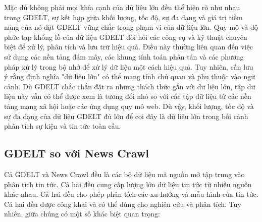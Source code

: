 Mặc dù không phải mọi khía cạnh của dữ liệu lớn đều thể hiện rõ như nhau trong GDELT, sự kết hợp giữa khối lượng, tốc độ, sự đa dạng và giá trị tiềm năng của nó đặt GDELT vững chắc trong phạm vi của dữ liệu lớn. Quy mô và độ phức tạp khổng lồ của dữ liệu GDELT đòi hỏi các công cụ và kỹ thuật chuyên biệt để xử lý, phân tích và lưu trữ hiệu quả. Điều này thường liên quan đến việc sử dụng các nền tảng đám mây, các khung tính toán phân tán và các phương pháp xử lý trong bộ nhớ để xử lý dữ liệu một cách hiệu quả. Tuy nhiên, cần lưu ý rằng định nghĩa "dữ liệu lớn" có thể mang tính chủ quan và phụ thuộc vào ngữ cảnh. Dù GDELT chắc chắn đặt ra những thách thức gắn với dữ liệu lớn, tập dữ liệu này vẫn có thể được xem là tương đối nhỏ so với các tập dữ liệu từ các nền tảng mạng xã hội hoặc các ứng dụng quy mô web. Dù vậy, khối lượng, tốc độ và sự đa dạng của dữ liệu GDELT đủ lớn để coi đây là dữ liệu lớn trong bối cảnh phân tích sự kiện và tin tức toàn cầu.

\subsection{GDELT so với News Crawl}

Cả GDELT và News Crawl đều là các bộ dữ liệu mã nguồn mở tập trung vào phân tích tin tức. Cả hai đều cung cấp lượng lớn dữ liệu tin tức từ nhiều nguồn khác nhau. Cả hai đều cho phép phân tích các xu hướng và mẫu hình của tin tức. Cả hai đều được công khai và có thể dùng cho nghiên cứu và phân tích. Tuy nhiên, giữa chúng có một số khác biệt quan trọng:

